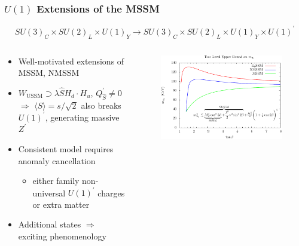 \documentclass[10pt,aspectratio=169]{beamer}
\begin{document}
\begin{frame}
  \frametitle{$U(1)$ Extensions of the MSSM}
    \begin{equation*}
      SU(3)_C \times SU(2)_L \times U(1)_Y \to
      SU(3)_C \times SU(2)_L \times U(1)_Y \times U(1)^\prime
    \end{equation*}
    \vspace{-15pt}
  \begin{columns}[t]
    \begin{column}{0.45\textwidth}
      \begin{itemize} \itemsep1em
        \item Well-motivated extensions of MSSM, NMSSM
        \item $W_{\text{USSM}} \supset \lambda \hat{S} H_d
          \cdot H_u$, $Q^\prime_{\hat{S}} \neq 0$ $\Rightarrow$
          $\langle S \rangle = s / \sqrt{2}$ also breaks $U(1)^\prime$,
          generating {\color{blue} massive $Z^\prime$}
        \item Consistent model requires anomaly cancellation
          \begin{itemize}
            \item either family non-universal $U(1)^\prime$ charges
              or {\color{blue} extra matter}
          \end{itemize}
        \item Additional states $\Rightarrow$ exciting phenomenology
      \end{itemize}
    \end{column}
    \begin{column}{0.6\textwidth}
      \vspace{-10pt}
      \begin{figure}
        \centering
        \includegraphics[width=\textwidth]{treelevel_higgs_upperbound_plot}

\end{figure}
\end{column}
\end{columns}
\end{frame}
\end{document}
